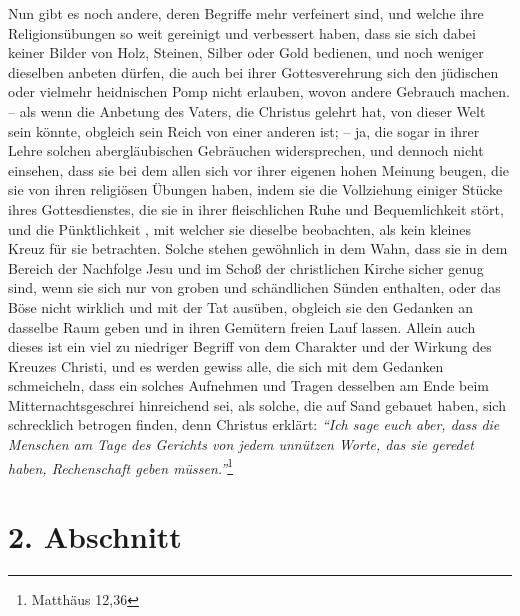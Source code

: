 Nun gibt es noch andere, deren Begriffe mehr
verfeinert sind, und welche ihre
Religionsübungen so weit
gereinigt und verbessert haben, dass sie sich dabei keiner Bilder von Holz,
Steinen, Silber oder Gold bedienen,
und noch weniger dieselben anbeten dürfen, die auch bei ihrer Gottesverehrung
sich den jüdischen  oder vielmehr heidnischen Pomp nicht
erlauben, wovon andere
Gebrauch
machen.  -- als wenn die Anbetung des Vaters, die Christus
gelehrt hat, von
dieser Welt sein könnte, obgleich sein Reich von einer anderen ist; -- ja, die
sogar in ihrer Lehre solchen abergläubischen Gebräuchen widersprechen, und
dennoch nicht einsehen, dass sie bei dem allen sich vor ihrer eigenen hohen
Meinung beugen, die sie von ihren religiösen Übungen haben, indem sie die
Vollziehung einiger Stücke ihres Gottesdienstes, die sie in ihrer fleischlichen
Ruhe und Bequemlichkeit stört, und die Pünktlichkeit , mit
welcher sie dieselbe
beobachten, als
kein kleines Kreuz für sie betrachten. Solche stehen
gewöhnlich in dem Wahn,
dass sie in dem Bereich der Nachfolge Jesu und im Schoß der christlichen
Kirche sicher genug sind, wenn sie sich nur von groben und schändlichen Sünden
enthalten,   oder das Böse
nicht wirklich und mit der Tat ausüben, obgleich sie
den Gedanken an dasselbe Raum geben und in ihren Gemütern freien Lauf lassen.
Allein auch dieses ist ein viel zu niedriger Begriff von dem Charakter und der
Wirkung des Kreuzes Christi, und es werden gewiss alle, die sich mit dem
Gedanken schmeicheln, dass ein solches Aufnehmen und Tragen desselben am Ende
beim Mitternachtsgeschrei
hinreichend sei,  als
solche, die auf Sand
gebauet haben, sich schrecklich betrogen finden, denn Christus erklärt:
\textit{"`Ich sage euch aber, dass die Menschen am Tage des Gerichts von jedem
unnützen Worte, das sie geredet haben, Rechenschaft geben
müssen."'}\footnote{Matthäus 12,36}

\section{2. Abschnitt} \label{kap6_ab2}

